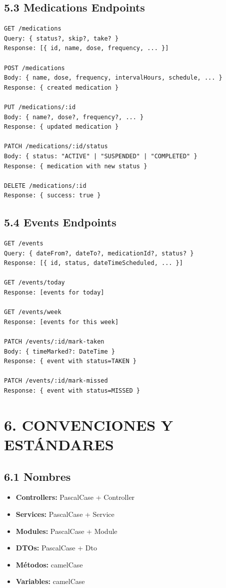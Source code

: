 \documentclass[12pt,a4paper]{article}
\begin{document}
\subsection{5.3 Medications Endpoints}

\begin{verbatim}
GET /medications
Query: { status?, skip?, take? }
Response: [{ id, name, dose, frequency, ... }]

POST /medications
Body: { name, dose, frequency, intervalHours, schedule, ... }
Response: { created medication }

PUT /medications/:id
Body: { name?, dose?, frequency?, ... }
Response: { updated medication }

PATCH /medications/:id/status
Body: { status: "ACTIVE" | "SUSPENDED" | "COMPLETED" }
Response: { medication with new status }

DELETE /medications/:id
Response: { success: true }
\end{verbatim}

\subsection{5.4 Events Endpoints}

\begin{verbatim}
GET /events
Query: { dateFrom?, dateTo?, medicationId?, status? }
Response: [{ id, status, dateTimeScheduled, ... }]

GET /events/today
Response: [events for today]

GET /events/week
Response: [events for this week]

PATCH /events/:id/mark-taken
Body: { timeMarked?: DateTime }
Response: { event with status=TAKEN }

PATCH /events/:id/mark-missed
Response: { event with status=MISSED }
\end{verbatim}

\section{6. CONVENCIONES Y ESTÁNDARES}

\subsection{6.1 Nombres}

\begin{itemize}
    \item \textbf{Controllers:} PascalCase + Controller
    \item \textbf{Services:} PascalCase + Service
    \item \textbf{Modules:} PascalCase + Module
    \item \textbf{DTOs:} PascalCase + Dto
    \item \textbf{Métodos:} camelCase
    \item \textbf{Variables:} camelCase
\end{itemize}
\end{document}
